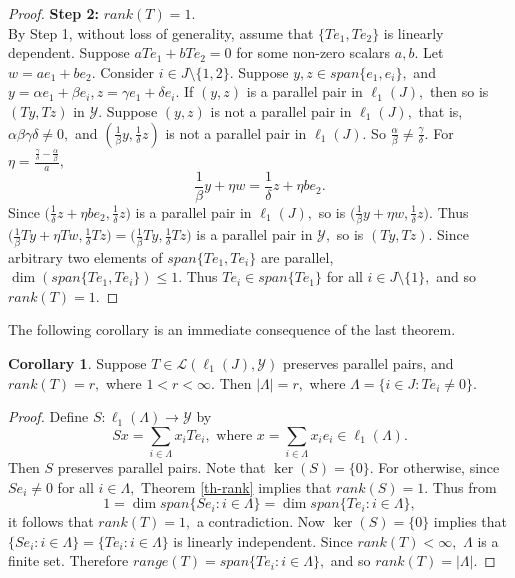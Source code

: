 \documentclass{amsart}
\theoremstyle{definition}
\newtheorem{cor}[theorem]{Corollary}
\theoremstyle{remark}
\numberwithin{equation}{section}
\begin{document}
\begin{proof}
	\textbf{Step 2:} $rank(T)=1.$ \\
	By Step 1, without loss of generality, assume that $\{Te_1,Te_2\}$ is linearly dependent. Suppose  $aTe_1+bTe_2=0$ for some non-zero scalars $a,b.$ Let $w=ae_1+be_2.$
	Consider $i\in J\setminus\{1,2\}.$ Suppose $y,z\in span\{e_1,e_i\},$ and $y=\alpha e_1+\beta e_i, z=\gamma e_1+\delta e_i.$ If $(y,z)$ is a parallel pair in $\ell_1(J),$ then so  is $(Ty,Tz)$ in $\mathcal{Y}.$ Suppose $(y,z)$ is not a parallel pair in $\ell_1(J),$ that is, $\alpha\beta\gamma\delta\neq 0,$ and  $(\frac{1}{\beta}y,\frac{1}{\delta}z)$ is not a parallel pair in $\ell_1(J).$ So $\frac{\alpha}{\beta}\neq \frac{\gamma}{\delta}.$ For $\eta=\frac{\frac{\gamma}{\delta}-\frac{\alpha}{\beta}}{a},$ $$\frac{1}{\beta}y+\eta w=\frac{1}{\delta}z+\eta be_2.$$ Since $\Big(\frac{1}{\delta}z+\eta be_2, \frac{1}{\delta}z\Big)$ is a parallel pair in $\ell_1(J),$ so is $\Big(\frac{1}{\beta}y+\eta w,\frac{1}{\delta}z\Big).$ Thus $\Big(\frac{1}{\beta}Ty+\eta Tw,\frac{1}{\delta}Tz\Big)=\Big(\frac{1}{\beta}Ty,\frac{1}{\delta}Tz\Big)$ is a parallel pair in $\mathcal{Y},$ so is $(Ty,Tz).$ Since arbitrary two elements of $span\{Te_1,Te_i\}$ are parallel, $\dim(span\{Te_1,Te_i\})\leq 1.$ Thus $Te_i\in span\{Te_1\}$ for all $i\in J\setminus \{1\},$  and so $rank(T)=1.$ 
\end{proof}



The following corollary is an immediate consequence of the last theorem.
\begin{cor}\label{cor-fr}
Suppose $T\in \mathcal{L}(\ell_1(J),\mathcal{Y})$ preserves parallel pairs, and $rank(T)=r,$ where $1<r<\infty.$ Then $|\Lambda|=r,$ where $\Lambda=\{i\in J:Te_i\neq 0\}.$ 
\end{cor}
\begin{proof}
	Define $S:\ell_1(\Lambda)\to \mathcal{Y}$ by 
	$$Sx=\sum_{i\in \Lambda}x_i Te_i, \text{ where }x=\sum_{i\in \Lambda}x_ie_i\in \ell_1(\Lambda).$$ %
	Then $S$ preserves parallel pairs. Note that $\ker(S)=\{0\}.$ For otherwise, since $Se_i\neq 0$ for all $i\in \Lambda,$ Theorem \ref{th-rank} implies that $rank(S)=1.$ Thus from
	$$1=\dim span\{Se_i:i\in \Lambda\}=\dim span\{Te_i:i\in \Lambda\},$$
	it follows that $rank(T)=1,$ a contradiction. Now $\ker(S)=\{0\}$ implies that $\{Se_i:i\in \Lambda\}=\{Te_i:i\in \Lambda\}$ is linearly independent. Since $rank(T)<\infty,$  $\Lambda$ is a finite set. Therefore $range(T)=span\{Te_i:i\in \Lambda\},$ and so $rank(T)=|\Lambda|.$
\end{proof}
\end{document}
